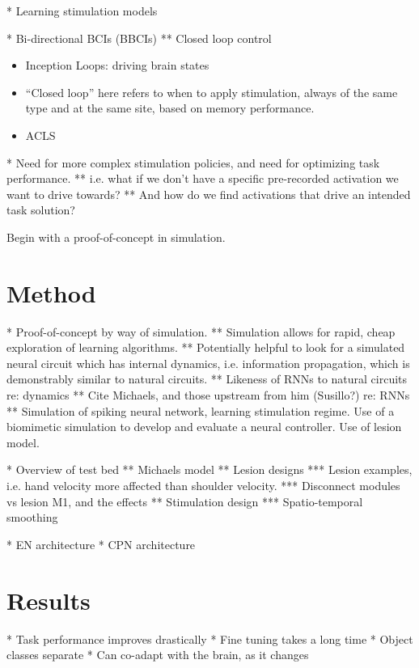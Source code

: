 \documentclass[12pt]{iopart}
\begin{document}
* Learning stimulation models \cite{shanechi.stimmodel}

* Bi-directional BCIs (BBCIs)
** Closed loop control
\begin{itemize}
	\item \cite{walker.inception} Inception Loops: driving brain states
	\item \cite{kahana.biomarker} “Closed loop” here refers to when to apply stimulation, always of the same type and at the same site, based on memory performance.
	\item \cite{tafazoli.acls} ACLS
\end{itemize}

* Need for more complex stimulation policies, and need for optimizing task performance.
** i.e. what if we don't have a specific pre-recorded activation we want to drive towards?
** And how do we find activations that drive an intended task solution?

Begin with a proof-of-concept in simulation.

\section{Method}

* Proof-of-concept by way of simulation.
** Simulation allows for rapid, cheap exploration of learning algorithms.
** Potentially helpful to look for a simulated neural circuit which has internal dynamics, i.e. information propagation, which is demonstrably similar to natural circuits.
** \cite{kao.sim} Likeness of RNNs to natural circuits re: dynamics
** Cite Michaels, and those upstream from him (Susillo?) re: RNNs
** \cite{bernal.sim} Simulation of spiking neural network, learning stimulation regime. Use of a biomimetic
  simulation to develop and evaluate a neural controller. Use of lesion model.

* Overview of test bed
** Michaels model \cite{michaels.mrnn}
** Lesion designs
*** Lesion examples, i.e. hand velocity more affected than shoulder velocity.
*** Disconnect modules vs lesion M1, and the effects
** Stimulation design
*** Spatio-temporal smoothing

* EN architecture
* CPN architecture

\section{Results}

* Task performance improves drastically
* Fine tuning takes a long time
* Object classes separate
* Can co-adapt with the brain, as it changes
\end{document}
